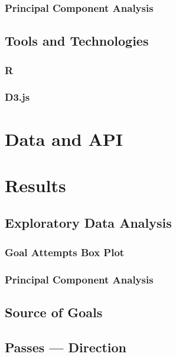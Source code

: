\documentclass[a4paper,11pt]{article}
\begin{document}
\subsubsection{Principal Component Analysis}


\subsection{Tools and Technologies} %
\subsubsection{R} %


\subsubsection{D3.js} %

\section{Data and API}

\section{Results}
\subsection{Exploratory Data Analysis}
\subsubsection{Goal Attempts Box Plot}

\subsubsection{Principal Component Analysis}

\label{sec:PCA}

\subsection{Source of Goals}


\subsection{Passes --- Direction}

\end{document}
